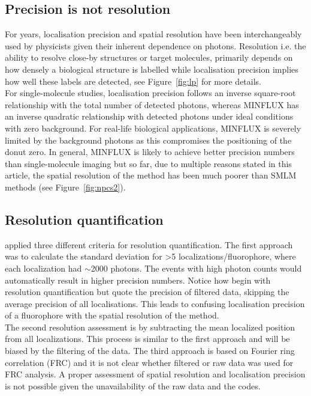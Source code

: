 \documentclass[9pt,twocolumn,twoside]{pnas-new}
\begin{document}
\subsection{Precision is not resolution}
For years, localisation precision and spatial resolution have been interchangeably used by physicists given their inherent dependence on photons. Resolution i.e. the ability to resolve close-by structures or target molecules, primarily depends on how densely a biological structure is labelled while localisation precision implies how well these labels are detected, see Figure~\ref{fig:lp} for more details. \\
For single-molecule studies, localisation precision follows an inverse square-root relationship with the total number of detected photons, whereas MINFLUX has an inverse quadratic relationship with detected photons under ideal conditions with zero background. For real-life biological applications, MINFLUX is severely limited by the background photons as this compromises the positioning of the donut zero. In general, MINFLUX  is likely to achieve better precision numbers than single-molecule imaging but so far, due to multiple reasons stated in this article, the spatial resolution of the method has been much poorer than SMLM methods (see Figure~\ref{fig:npcs2}).  

\subsection{Resolution quantification}
\cite{gwosch2020minflux} applied three different criteria for resolution quantification. The first approach was to calculate the standard deviation for >5 localizations/fluorophore, where each localization had $\sim$2000 photons. The events with high photon counts would automatically result in higher precision numbers. Notice how \cite{gwosch2020minflux} begin with resolution quantification but quote the precision of filtered data, skipping the average precision of all localisations. This leads to confusing localisation precision of a fluorophore with the spatial resolution of the method. \\
The second resolution assessment is by subtracting the mean localized position from all localizations. This process is similar to the first approach and will be biased by the filtering of the data. %
The third approach is based on Fourier ring correlation (FRC) and it is not clear whether filtered or raw data was used for FRC analysis. A proper assessment of spatial resolution and localisation precision is not possible given the unavailability of the raw data and the codes. %
\end{document}
